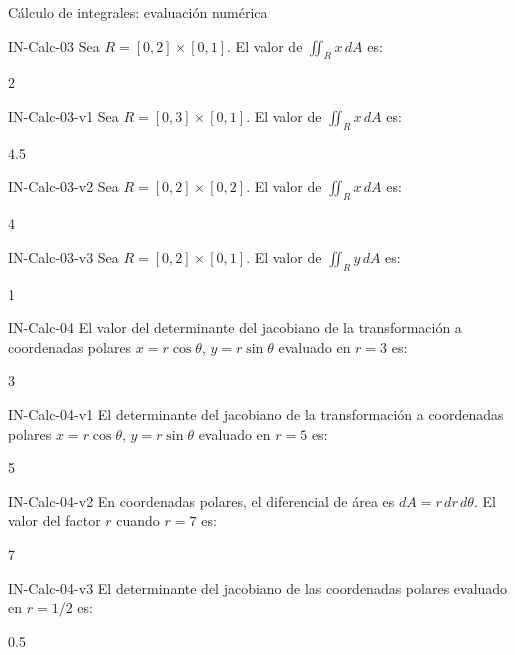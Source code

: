 \documentclass[a4,11pt]{aleph-notas}
\begin{document}
\begin{quiz}{Cálculo de integrales: evaluación numérica}
\begin{numerical}[tolerance=0.01]%
    {IN-Calc-03}
    Sea $R = [0,2]\times[0,1]$. El valor de $\displaystyle\iint_R x\,dA$ es:
    \item 2
\end{numerical}

\begin{numerical}[tolerance=0.01]%
    {IN-Calc-03-v1}
    Sea $R = [0,3]\times[0,1]$. El valor de $\displaystyle\iint_R x\,dA$ es:
    \item 4.5
\end{numerical}

\begin{numerical}[tolerance=0.01]%
    {IN-Calc-03-v2}
    Sea $R = [0,2]\times[0,2]$. El valor de $\displaystyle\iint_R x\,dA$ es:
    \item 4
\end{numerical}

\begin{numerical}[tolerance=0.01]%
    {IN-Calc-03-v3}
    Sea $R = [0,2]\times[0,1]$. El valor de $\displaystyle\iint_R y\,dA$ es:
    \item 1
\end{numerical}

\begin{numerical}[tolerance=0.01]%
    {IN-Calc-04}
    El valor del determinante del jacobiano de la transformación a coordenadas polares $x=r\cos\theta$, $y=r\sin\theta$ evaluado en $r=3$ es:
    \item 3
\end{numerical}

\begin{numerical}[tolerance=0.01]%
    {IN-Calc-04-v1}
    El determinante del jacobiano de la transformación a coordenadas polares $x=r\cos\theta$, $y=r\sin\theta$ evaluado en $r=5$ es:
    \item 5
\end{numerical}

\begin{numerical}[tolerance=0.01]%
    {IN-Calc-04-v2}
    En coordenadas polares, el diferencial de área es $dA=r\,dr\,d\theta$. El valor del factor $r$ cuando $r=7$ es:
    \item 7
\end{numerical}

\begin{numerical}[tolerance=0.01]%
    {IN-Calc-04-v3}
    El determinante del jacobiano de las coordenadas polares evaluado en $r=1/2$ es:
    \item 0.5
\end{numerical}


\end{quiz}
\end{document}
